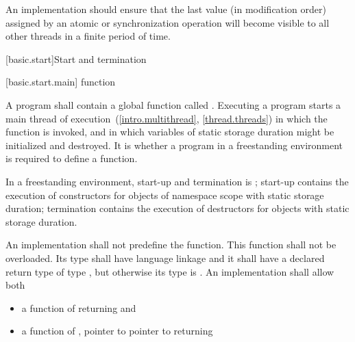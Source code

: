 \pnum
An implementation should ensure that the last value (in modification order)
assigned by an atomic or synchronization operation will become visible to all
other threads in a finite period of time.%
%

[basic.start]{Start and termination}

[basic.start.main]{ function}

\pnum
{}%
A program shall contain a global function called .
Executing a program starts a main thread of execution~(\ref{intro.multithread}, \ref{thread.threads})
in which the  function is invoked,
and in which variables of static storage duration
might be initialized and destroyed.
It is 
whether a program in a freestanding environment is required to define a 
function. \begin{note} In a freestanding environment, start-up and termination is
; start-up contains the
execution of constructors for objects of namespace scope with static storage duration;
termination contains the execution of destructors for objects with static storage
duration. \end{note}

\pnum
An implementation shall not predefine the  function. This
function shall not be overloaded.  Its type shall have \Cpp{} language linkage
and it shall have a declared return type of type
, but otherwise its type is .
%
An implementation shall allow both
\begin{itemize}
\item a function of \tcode{()} returning  and
\item a function of , pointer to pointer to  returning 
\end{itemize}

